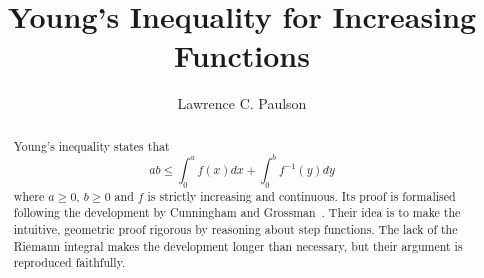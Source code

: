 \documentclass[11pt,a4paper]{report}
\begin{document}
\title{Young's Inequality for Increasing Functions}
\author{Lawrence C. Paulson}
\maketitle

\begin{abstract}
Young's inequality states that
\[ ab \leq \int_0^a f(x)dx + \int_0^b f^{-1}(y) dy  \]
where $a\geq 0$, $b\geq 0$ and $f$ is strictly increasing and continuous.
Its proof is formalised following the development by Cunningham and Grossman~\cite{cunningham-youngs}.
Their idea is to make the intuitive, geometric proof rigorous by reasoning about step functions.
The lack of the Riemann integral makes the development longer than necessary, but their argument is reproduced faithfully.
\end{abstract}

\tableofcontents





\end{document}
